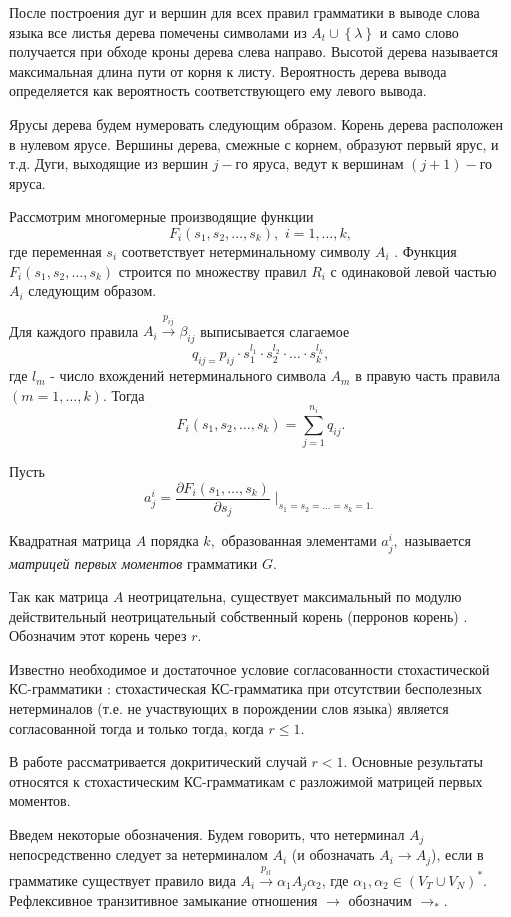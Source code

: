 \documentclass[%
11pt,a4paper]{article}
\begin{document}
{После построения дуг и вершин для всех правил грамматики в выводе слова
языка все листья дерева помечены символами из $A_t\cup \left\{\lambda\right\}$ и само
слово получается при обходе кроны дерева слева направо.
Высотой дерева называется максимальная длина пути от корня к листу. Вероятность дерева вывода определяется как вероятность соответствующего ему левого вывода.

Ярусы дерева будем нумеровать следующим образом.
Корень дерева расположен в нулевом ярусе. Вершины дерева,
смежные с корнем, образуют первый ярус, и т.д.
Дуги, выходящие из вершин $j-$го яруса, ведут к вершинам $(j+1)-$го яруса.

Рассмотрим многомерные производящие функции
$$
F_i( s_1,s_2,\ldots ,s_k) ,\,\,i=1,\ldots ,k,
$$
где переменная $s_i$ соответствует нетерминальному символу $A_i$ \cite{sev}.
Функция $F_i( s_1,s_2,\ldots ,s_k) $ строится по множеству правил $R_i$ с
одинаковой левой частью $A_i$ следующим образом.

Для каждого правила $A_i\stackrel{p_{ij}}{\rightarrow }\beta_{ij}$
выписывается слагаемое
$$
q_{ij=}p_{ij}\cdot s_1^{l_1}\cdot s_2^{l_2}\cdot \ldots \cdot s_k^{l_k},
$$
где $l_m$ - число вхождений нетерминального символа $A_m$ в правую часть
правила $(m=1, \ldots ,k).$
Тогда
$$
F_i( s_1,s_2,\ldots ,s_k) =\sum_{j=1}^{n_i}q_{ij}.
$$

Пусть
$$
a^{i}_{j}=\frac{\partial F_i( s_1,\ldots ,s_k) }{\partial s_j}\mid
_{s_1=s_2=\ldots =s_k=1.}
$$

Квадратная матрица $A$ порядка $k,$ образованная элементами $a^{i}_{j},$
называется {\it матрицей первых моментов} грамматики $G.$

Так как матрица $A$ неотрицательна, существует максимальный по модулю
действительный неотрицательный собственный корень (перронов корень) \cite{gant}.
Обозначим этот корень через $r$.

Известно необходимое и достаточное условие согласованности стохастической
КС-грамматики \cite{fu}:
стохастическая КС-грамматика при отсутствии бесполезных нетерминалов
(т.е. не участвующих в порождении слов языка) является согласованной тогда
и только тогда, когда $r\leq 1.$

В работе рассматривается докритический случай  $r < 1.$
Основные результаты относятся к стохастическим
КС-грамматикам с разложимой матрицей \cite{gant} первых моментов.

Введем некоторые обозначения.
Будем говорить, что нетерминал $A_j$ непосредственно следует за нетерминалом  $A_i$
(и обозначать $A_i \rightarrow A_j$), если в грамматике существует правило вида $A_i\stackrel{p_{il}}{\rightarrow}\alpha_1 A_j \alpha_2$, где $\alpha_1,\alpha_2 \in (V_T \cup V_N)^*.$
Рефлексивное транзитивное замыкание отношения $\rightarrow$ обозначим $\rightarrow _*.$

}
\end{document}
